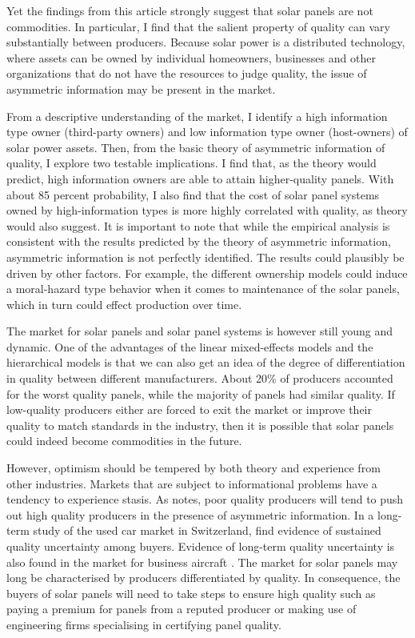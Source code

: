 \documentclass[a4paper]{article}
\begin{document}
Yet the findings from this article strongly suggest that solar panels are not commodities. In particular, I find that the salient property of quality can vary substantially between producers. Because solar power is a distributed technology, where assets can be owned by individual homeowners, businesses and other organizations that do not have the resources to judge quality, the issue of asymmetric information may be present in the market.

From a descriptive understanding of the market, I identify a high information type owner (third-party owners) and low information type owner (host-owners) of solar power assets. Then, from the basic theory of asymmetric information of quality, I explore two testable implications. I find that, as the theory would predict, high information owners are able to attain higher-quality panels. With about 85 percent probability, I also find that the cost of solar panel systems owned by high-information types is more highly correlated with quality, as theory would also suggest. It is important to note that while the empirical analysis is consistent with the results predicted by the theory of asymmetric information, asymmetric information is not perfectly identified. The results could plausibly be driven by other factors. For example, the different ownership models could induce a moral-hazard type behavior when it comes to maintenance of the solar panels, which in turn could effect production over time.

The market for solar panels and solar panel systems is however still young and dynamic. One of the advantages of the linear mixed-effects models and the hierarchical models is that we can also get an idea of the degree of differentiation in quality between different manufacturers. About 20\% of producers accounted for the worst quality panels, while the majority of panels had similar quality. If low-quality producers either are forced to exit the market or improve their quality to match standards in the industry, then it is possible that solar panels could indeed become commodities in the future.

However, optimism should be tempered by both theory and experience from other industries. Markets that are subject to informational problems have a tendency to experience stasis. As \citet{akerlof_market_1970} notes, poor quality producers will tend to push out high quality producers in the presence of asymmetric information. In a long-term study of the used car market in Switzerland, \citet{emons_market_2009} find evidence of sustained quality uncertainty among buyers. Evidence of long-term quality uncertainty is also found in the market for business aircraft \citep{gilligan_lemons_2004}. The market for solar panels may long be characterised by producers differentiated by quality. In consequence, the buyers of solar panels will need to take steps to ensure high quality such as paying a premium for panels from a reputed producer or making use of engineering firms specialising in certifying panel quality.
\end{document}
